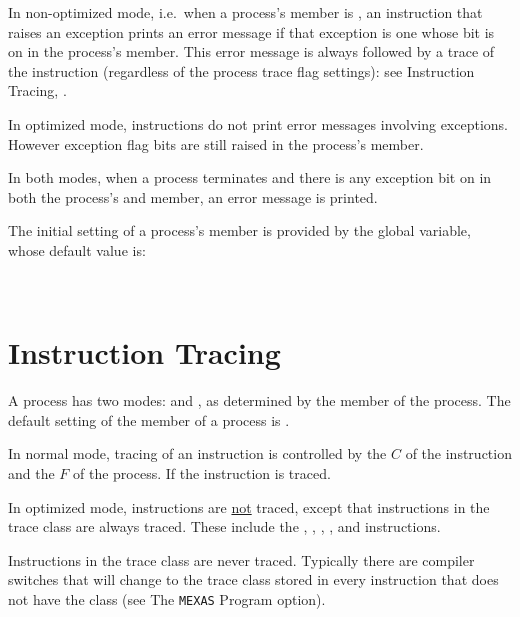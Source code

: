 \documentclass[12pt]{article}
\begin{document}
In non-optimized mode, i.e.~when a process's  member is ,
an instruction that raises an exception prints
an error message if that exception is one whose bit
is on in the process's \label{EXCEPTS-MASK} member.
This error message is always followed by a trace of the instruction
(regardless of the process trace flag settings): see
Instruction Tracing, .

In optimized mode, instructions do not print error messages
involving exceptions.  However exception flag bits are still
raised in the process's  member.

In both modes, when a process terminates and there is any exception
bit on in both the process's 
and  member, an error message is printed.

The initial setting of a process's  member is
provided by the 
global variable, whose default value is:
\begin{center}
 ~~  ~~ 
\end{center}

\section{Instruction Tracing}
\label{INSTRUCTION-TRACING}

A process has two modes:  and , as
determined by the \label{OPTIMIZE} member of the process.
The default setting of the  member of a process
is .

In normal mode, tracing of an instruction
is controlled by the  $C$ of the instruction
and the \label{TRACE-FLAGS} $F$ of the process.  If
 the instruction is traced.

In optimized mode, instructions are \underline{not} traced,
except that instructions in the  trace class are always
traced.  These include the , ,
,
, and  instructions.

Instructions in the  trace class are never
traced.  Typically there are compiler switches that will
change to  the trace class stored in every instruction that
does not have the  class
(see The {\tt MEXAS} Program  option).
\end{document}
